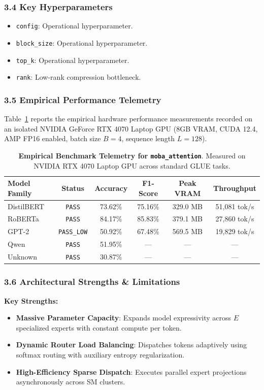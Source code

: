 \subsubsection*{3.4 Key Hyperparameters}
\begin{itemize}
    \item \texttt{config}: Operational hyperparameter.
    \item \texttt{block\_size}: Operational hyperparameter.
    \item \texttt{top\_k}: Operational hyperparameter.
    \item \texttt{rank}: Low-rank compression bottleneck.
\end{itemize}

\subsubsection*{3.5 Empirical Performance Telemetry}
Table~\ref{tab:telemetry_moba_attention} reports the empirical hardware performance measurements recorded on an isolated NVIDIA GeForce RTX 4070 Laptop GPU (8GB VRAM, CUDA 12.4, AMP FP16 enabled, batch size $B=4$, sequence length $L=128$).

\begin{table}[h]
\centering
\small
\caption{\textbf{Empirical Benchmark Telemetry for \texttt{moba\_attention}}. Measured on NVIDIA RTX 4070 Laptop GPU across standard GLUE tasks.}
\label{tab:telemetry_moba_attention}
\begin{tabular*}{\columnwidth}{@{\extracolsep{\fill}}lccccc}
\toprule
\textbf{Model Family} & \textbf{Status} & \textbf{Accuracy} & \textbf{F1-Score} & \textbf{Peak VRAM} & \textbf{Throughput} \\
\midrule
DistilBERT & \texttt{PASS} & 73.62\% & 75.16\% & 329.0 MB & 51,081 tok/s \\
RoBERTa & \texttt{PASS} & 84.17\% & 85.83\% & 379.1 MB & 27,860 tok/s \\
GPT-2 & \texttt{PASS\_LOW} & 50.92\% & 67.48\% & 569.5 MB & 19,829 tok/s \\
Qwen & \texttt{PASS} & 51.95\% & --- & --- & --- \\
Unknown & \texttt{PASS} & 30.87\% & --- & --- & --- \\
\bottomrule
\end{tabular*}
\end{table}

\subsubsection*{3.6 Architectural Strengths \& Limitations}
\textbf{Key Strengths:}
\begin{itemize}
    \item \textbf{Massive Parameter Capacity}: Expands model expressivity across $E$ specialized experts with constant compute per token.
    \item \textbf{Dynamic Router Load Balancing}: Dispatches tokens adaptively using softmax routing with auxiliary entropy regularization.
    \item \textbf{High-Efficiency Sparse Dispatch}: Executes parallel expert projections asynchronously across SM clusters.
\end{itemize}

